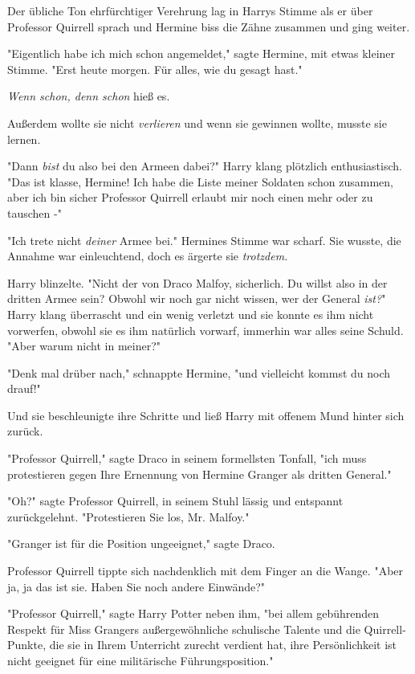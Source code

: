 {Der übliche Ton ehrfürchtiger Verehrung lag in Harrys Stimme als er über Professor Quirrell sprach und Hermine biss die Zähne zusammen und ging weiter.

"Eigentlich habe ich mich schon angemeldet," sagte Hermine, mit etwas kleiner Stimme. "Erst heute morgen. Für alles, wie du gesagt hast."

\emph{Wenn schon, denn schon} hieß es.

Außerdem wollte sie nicht \emph{verlieren} und wenn sie gewinnen wollte, musste sie lernen.

"Dann \emph{bist} du also bei den Armeen dabei?" Harry klang plötzlich enthusiastisch. "Das ist klasse, Hermine! Ich habe die Liste meiner Soldaten schon zusammen, aber ich bin sicher Professor Quirrell erlaubt mir noch einen mehr oder zu tauschen -"

"Ich trete nicht \emph{deiner} Armee bei." Hermines Stimme war scharf. Sie wusste, die Annahme war einleuchtend, doch es ärgerte sie \emph{trotzdem.}

Harry blinzelte. "Nicht der von Draco Malfoy, sicherlich. Du willst also in der dritten Armee sein? Obwohl wir noch gar nicht wissen, wer der General \emph{ist?}" Harry klang überrascht und ein wenig verletzt und sie konnte es ihm nicht vorwerfen, obwohl sie es ihm natürlich vorwarf, immerhin war alles seine Schuld. "Aber warum nicht in meiner?"

"Denk mal drüber nach," schnappte Hermine, "und vielleicht kommst du noch drauf!"

Und sie beschleunigte ihre Schritte und ließ Harry mit offenem Mund hinter sich zurück.

\later

"Professor Quirrell," sagte Draco in seinem formellsten Tonfall, "ich muss protestieren gegen Ihre Ernennung von Hermine Granger als dritten General."

"Oh?" sagte Professor Quirrell, in seinem Stuhl lässig und entspannt zurückgelehnt. "Protestieren Sie los, Mr. Malfoy."

"Granger ist für die Position ungeeignet," sagte Draco.

Professor Quirrell tippte sich nachdenklich mit dem Finger an die Wange. "Aber ja, ja das ist sie. Haben Sie noch andere Einwände?"

"Professor Quirrell," sagte Harry Potter neben ihm, "bei allem gebührenden Respekt für Miss Grangers außergewöhnliche schulische Talente und die Quirrell-Punkte, die sie in Ihrem Unterricht zurecht verdient hat, ihre Persönlichkeit ist nicht geeignet für eine militärische Führungsposition."

}
